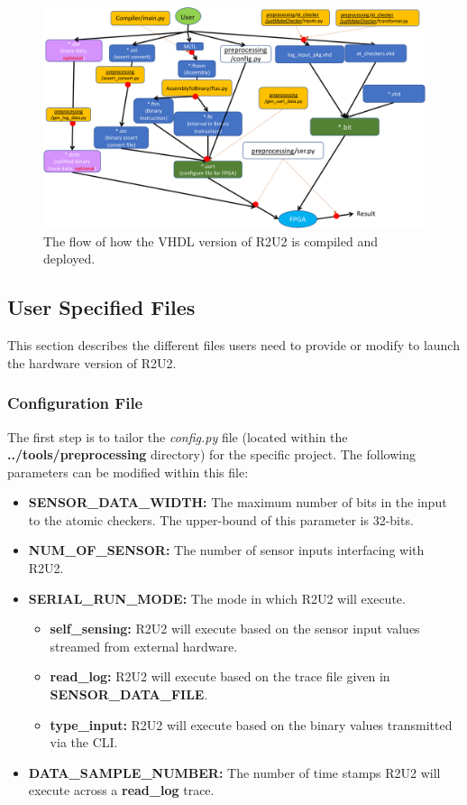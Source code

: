 \begin{figure}[H]
	\begin{center}
	\includegraphics[scale=0.5]{fig/r2u2_fpga_flow.pdf}
	\caption{The flow of how the VHDL version of R2U2 is compiled and deployed. 
	\label{fig:r2u2hwFlow}} 
	\end{center}
\end{figure}

\subsection{User Specified Files}
This section describes the different files users need to provide or modify to launch the hardware version of R2U2. 
\subsubsection{Configuration File}
\label{config}
The first step is to tailor the \textit{config.py} file (located within the \textbf{../tools/preprocessing} directory) for the specific project. The following parameters can be modified within this file:
\begin{itemize}
	\item \textbf{SENSOR\_DATA\_WIDTH:} The maximum number of bits in the input to the atomic checkers. The upper-bound of this parameter is 32-bits.
	\item \textbf{NUM\_OF\_SENSOR:} The number of sensor inputs interfacing with R2U2.
	\item \textbf{SERIAL\_RUN\_MODE:} The mode in which R2U2 will execute.
	\begin{itemize}
		\item \textbf{self\_sensing:} R2U2 will execute based on the sensor input values streamed from external hardware.
		\item \textbf{read\_log:} R2U2 will execute based on the trace file given in \textbf{SENSOR\_DATA\_FILE}.
		\item \textbf{type\_input:} R2U2 will execute based on the binary values transmitted via the CLI.
	\end{itemize}
	\item \textbf{DATA\_SAMPLE\_NUMBER:} The number of time stamps R2U2 will execute across a \textbf{read\_log} trace.
\end{itemize}

